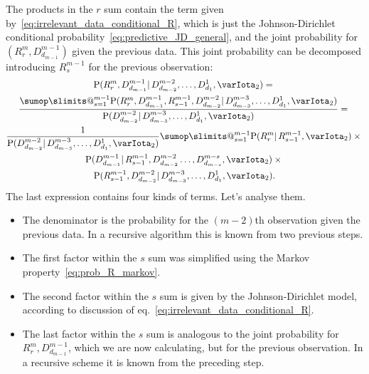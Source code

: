 \documentclass[\ifafour a4paper,12pt,\else a5paper,10pt,\fi%
onecolumn,oneside,article,%
british%
]{memoir}
\makeatletter
\theoremstyle{remark}
\theoremstyle{innote}
\def\sum{\DOTSI\sumop\slimits@}
\newcommand*{\p}{\mathrm{P}}%
\renewcommand*{\|}{\mathpunct{|}}
\newcommand*{\eqn}{eq.}%
\newcommand*{\yI}{\varIota}
\newcommand*{\yMc}{\yI_2}
\makeatother
\begin{document}
The products in the $r$ sum contain the term given
by~\eqref{eq:irrelevant_data_conditional_R}, which is just the
Johnson-Dirichlet conditional probability~\eqref{eq:predictive_JD_general},
and the joint probability for $(R^{m}_{r}, D^{m-1}_{d_{m-1}})$ given the
previous data. This joint probability can be decomposed introducing
$R^{m-1}_{s}$ for the previous observation:
\begin{multline}
  \label{eq:prob_R_and_last_decompose}
  \p(R^{m}_{r}, D^{m-1}_{d_{m-1}} \| D^{m-2}_{d_{m-2}}, \dotsc, D^{1}_{d_{1}}, \yMc) 
 ={} \\
  \frac{\sum_{s=1}^{m-1}
    \p(R^{m}_{r}, D^{m-1}_{d_{m-1}}, R^{m-1}_{s-1}, D^{m-2}_{d_{m-2}}
    \| D^{m-3}_{d_{m-3}}, \dotsc, D^{1}_{d_{1}}, \yMc)}{
\p(D^{m-2}_{d_{m-2}} \| D^{m-3}_{d_{m-3}}, \dotsc, D^{1}_{d_{1}}, \yMc)}
  ={}\\
    \frac{1}{\p(D^{m-2}_{d_{m-2}} \| D^{m-3}_{d_{m-3}}, \dotsc, D^{1}_{d_{1}}, \yMc)}
  \sum_{s=1}^{m-1} \p(R^{m}_{r} \| R^{m-1}_{s-1}, \yMc)
  \times{}\\
  \p(D^{m-1}_{d_{m-1}} \|
    R^{m-1}_{s-1}, D^{m-2}_{d_{m-2}} \dotsc, D^{m-s}_{d_{m-s}}, \yMc)
    \times{}\\
 \p(R^{m-1}_{s-1}, D^{m-2}_{d_{m-2}} \|
  D^{m-3}_{d_{m-3}},\dotsc, D^{1}_{d_{1}}, \yMc).
\end{multline}
The last expression contains four kinds of terms. Let's analyse them.

\begin{itemize}
\item The denominator is the probability for the $(m-2)$th observation
  given the previous data. In a recursive algorithm this is known from two
  previous steps.

\item The first factor within the $s$ sum was simplified using the Markov
  property~\eqref{eq:prob_R_markov}.

\item The second factor within the $s$ sum is given by the
  Johnson-Dirichlet model, according to discussion of
  \eqn~\eqref{eq:irrelevant_data_conditional_R}.

\item The last factor within the $s$ sum is analogous to the joint
  probability for $R^{m}_{r}, D^{m-1}_{d_{m-1}}$, which we are now
  calculating, but for the previous observation. In a recursive scheme it
  is known from the preceding step.
\end{itemize}
\end{document}
